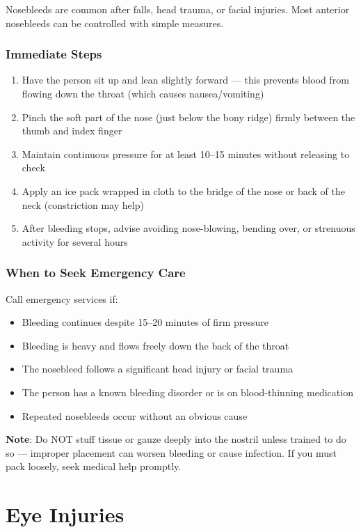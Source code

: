 Nosebleeds are common after falls, head trauma, or facial injuries. Most anterior nosebleeds can be controlled with simple measures.

\subsubsection{Immediate Steps}

\begin{enumerate}[leftmargin=*]
  \item Have the person sit up and lean slightly forward — this prevents blood from flowing down the throat (which causes nausea/vomiting)
  \item Pinch the soft part of the nose (just below the bony ridge) firmly between the thumb and index finger
  \item Maintain continuous pressure for at least 10–15 minutes without releasing to check
  \item Apply an ice pack wrapped in cloth to the bridge of the nose or back of the neck (constriction may help)
  \item After bleeding stops, advise avoiding nose-blowing, bending over, or strenuous activity for several hours
\end{enumerate}
\subsubsection{When to Seek Emergency Care}

Call emergency services if:
\begin{itemize}[leftmargin=*]
  \item Bleeding continues despite 15–20 minutes of firm pressure
  \item Bleeding is heavy and flows freely down the back of the throat
  \item The nosebleed follows a significant head injury or facial trauma
  \item The person has a known bleeding disorder or is on blood-thinning medication
  \item Repeated nosebleeds occur without an obvious cause
\end{itemize}

\noindent\textbf{Note}: Do NOT stuff tissue or gauze deeply into the nostril unless trained to do so — improper placement can worsen bleeding or cause infection. If you must pack loosely, seek medical help promptly.

\section{Eye Injuries}

